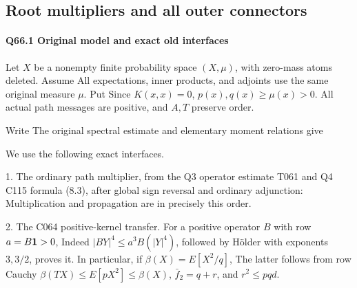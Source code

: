 \subsection{Root multipliers and all outer connectors}\label{proof:Q5-C066}
\paragraph{Q66.1 Original model and exact old interfaces}

Let \(X\) be a nonempty finite probability space \((X,\allowbreak  \mu)\), with
zero-mass atoms deleted. Assume
All expectations, inner products, and adjoints use the same original
measure \(\mu\). Put
Since \(K(x,\allowbreak  x)=0\), \(p(x),\allowbreak  q(x)\ge\mu(x)>0\).
All actual path messages are positive, and \(A,\allowbreak  T\) preserve order.

Write
The original spectral estimate and elementary moment
relations give


We use the following exact interfaces.

1. The ordinary path multiplier, from the Q3 operator
   estimate T061 and Q4 C115 formula (8.3), after global sign reversal
   and ordinary adjunction:
   Multiplication and propagation are in precisely this order.

2. The C064 positive-kernel transfer. For a positive operator \(B\)
   with row \(a=B\mathbf1>0\),
   Indeed \(|BY|^4\le a^3B(|Y|^4)\), followed by Hölder with
   exponents \(3,\allowbreak  3/2\), proves it. In particular, if
   \(\beta(X)=E[X^2/q]\),
   The latter follows from row Cauchy
   \(\beta(TX)\le E[pX^2]\le\beta(X)\),
   \(\bar f_2=q+r\), and \(r^2\le pqd\).

